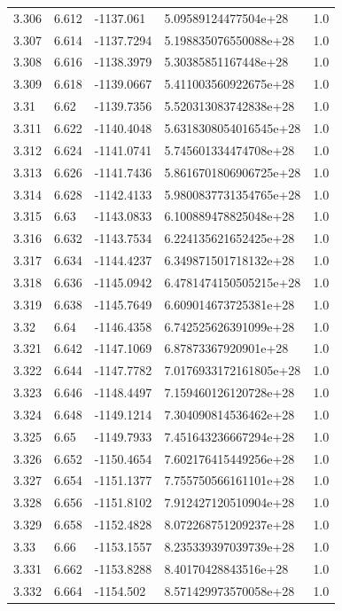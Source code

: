 \begin{tabular}{lllll}
3.306 & 6.612 & -1137.061 & 5.09589124477504e+28 & 1.0 \\
3.307 & 6.614 & -1137.7294 & 5.198835076550088e+28 & 1.0 \\
3.308 & 6.616 & -1138.3979 & 5.30385851167448e+28 & 1.0 \\
3.309 & 6.618 & -1139.0667 & 5.411003560922675e+28 & 1.0 \\
3.31 & 6.62 & -1139.7356 & 5.520313083742838e+28 & 1.0 \\
3.311 & 6.622 & -1140.4048 & 5.6318308054016545e+28 & 1.0 \\
3.312 & 6.624 & -1141.0741 & 5.745601334474708e+28 & 1.0 \\
3.313 & 6.626 & -1141.7436 & 5.8616701806906725e+28 & 1.0 \\
3.314 & 6.628 & -1142.4133 & 5.9800837731354765e+28 & 1.0 \\
3.315 & 6.63 & -1143.0833 & 6.100889478825048e+28 & 1.0 \\
3.316 & 6.632 & -1143.7534 & 6.224135621652425e+28 & 1.0 \\
3.317 & 6.634 & -1144.4237 & 6.349871501718132e+28 & 1.0 \\
3.318 & 6.636 & -1145.0942 & 6.4781474150505215e+28 & 1.0 \\
3.319 & 6.638 & -1145.7649 & 6.609014673725381e+28 & 1.0 \\
3.32 & 6.64 & -1146.4358 & 6.742525626391099e+28 & 1.0 \\
3.321 & 6.642 & -1147.1069 & 6.87873367920901e+28 & 1.0 \\
3.322 & 6.644 & -1147.7782 & 7.0176933172161805e+28 & 1.0 \\
3.323 & 6.646 & -1148.4497 & 7.159460126120728e+28 & 1.0 \\
3.324 & 6.648 & -1149.1214 & 7.304090814536462e+28 & 1.0 \\
3.325 & 6.65 & -1149.7933 & 7.451643236667294e+28 & 1.0 \\
3.326 & 6.652 & -1150.4654 & 7.602176415449256e+28 & 1.0 \\
3.327 & 6.654 & -1151.1377 & 7.755750566161101e+28 & 1.0 \\
3.328 & 6.656 & -1151.8102 & 7.912427120510904e+28 & 1.0 \\
3.329 & 6.658 & -1152.4828 & 8.072268751209237e+28 & 1.0 \\
3.33 & 6.66 & -1153.1557 & 8.235339397039739e+28 & 1.0 \\
3.331 & 6.662 & -1153.8288 & 8.40170428843516e+28 & 1.0 \\
3.332 & 6.664 & -1154.502 & 8.571429973570058e+28 & 1.0 \\

\end{tabular}

